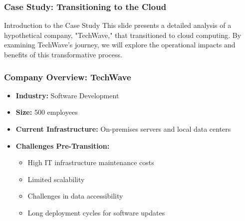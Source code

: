 \documentclass[aspectratio=169]{beamer}
\begin{document}
\begin{frame}[fragile]
    \frametitle{Case Study: Transitioning to the Cloud}
    \begin{block}{Introduction to the Case Study}
        This slide presents a detailed analysis of a hypothetical company, "TechWave," that transitioned to cloud computing. By examining TechWave's journey, we will explore the operational impacts and benefits of this transformative process.
    \end{block}
\end{frame}

\begin{frame}[fragile]
    \frametitle{Company Overview: TechWave}
    \begin{itemize}
        \item \textbf{Industry:} Software Development
        \item \textbf{Size:} 500 employees
        \item \textbf{Current Infrastructure:} On-premises servers and local data centers
        \item \textbf{Challenges Pre-Transition:}
        \begin{itemize}
            \item High IT infrastructure maintenance costs
            \item Limited scalability
            \item Challenges in data accessibility 
            \item Long deployment cycles for software updates
        \end{itemize}
    \end{itemize}
\end{frame}
\end{document}
